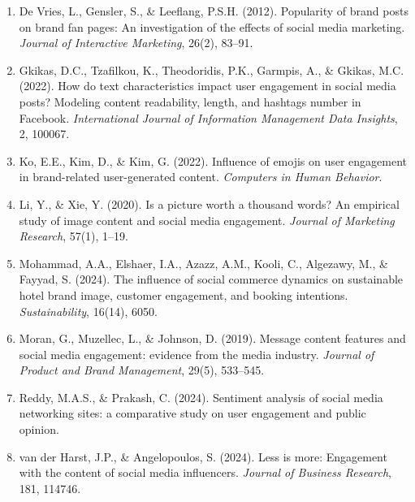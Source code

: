 \documentclass[12pt,a4paper]{ctexart}
\begin{document}
\begin{enumerate}
    \item De Vries, L., Gensler, S., \& Leeflang, P.S.H. (2012). Popularity of brand posts on brand fan pages: An investigation of the effects of social media marketing. \textit{Journal of Interactive Marketing}, 26(2), 83--91.
    \item Gkikas, D.C., Tzafilkou, K., Theodoridis, P.K., Garmpis, A., \& Gkikas, M.C. (2022). How do text characteristics impact user engagement in social media posts? Modeling content readability, length, and hashtags number in Facebook. \textit{International Journal of Information Management Data Insights}, 2, 100067.
    \item Ko, E.E., Kim, D., \& Kim, G. (2022). Influence of emojis on user engagement in brand-related user-generated content. \textit{Computers in Human Behavior}.
    \item Li, Y., \& Xie, Y. (2020). Is a picture worth a thousand words? An empirical study of image content and social media engagement. \textit{Journal of Marketing Research}, 57(1), 1--19.
    \item Mohammad, A.A., Elshaer, I.A., Azazz, A.M., Kooli, C., Algezawy, M., \& Fayyad, S. (2024). The influence of social commerce dynamics on sustainable hotel brand image, customer engagement, and booking intentions. \textit{Sustainability}, 16(14), 6050.
    \item Moran, G., Muzellec, L., \& Johnson, D. (2019). Message content features and social media engagement: evidence from the media industry. \textit{Journal of Product and Brand Management}, 29(5), 533--545.
    \item Reddy, M.A.S., \& Prakash, C. (2024). Sentiment analysis of social media networking sites: a comparative study on user engagement and public opinion.
    \item van der Harst, J.P., \& Angelopoulos, S. (2024). Less is more: Engagement with the content of social media influencers. \textit{Journal of Business Research}, 181, 114746.
\end{enumerate}
\end{document}
